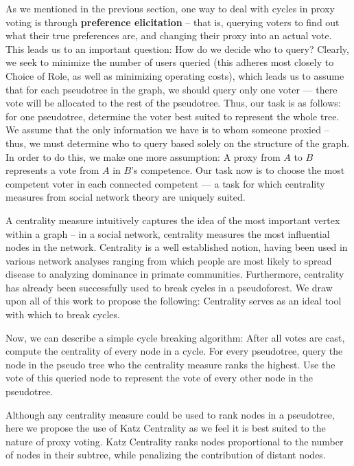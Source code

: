 \documentclass[10pt]{article}
\theoremstyle{definition}
\begin{document}
As we mentioned in the previous section, one way to deal with cycles in proxy voting is through \textbf{preference elicitation} -- that is, querying voters to find out what their true preferences are, and changing their proxy into an actual vote. This leads us to an important question: How do we decide who to query? Clearly, we seek to minimize the number of users queried (this adheres most closely to Choice of Role, as well as minimizing operating costs), which leads us to assume that for each pseudotree in the graph, we should query only one voter --- there vote will be allocated to the rest of the pseudotree. Thus, our task is as follows: for one pseudotree, determine the voter best suited to represent the whole tree. We assume that the only information we have is to whom someone proxied -- thus, we must determine who to query based solely on the structure of the graph. In order to do this, we make one more assumption: A proxy from $A$ to $B$ represents a vote from $A$ in $B$'s competence. Our task now is to choose the most competent voter in each connected competent --- a task for which centrality measures from social network theory are uniquely suited.

A centrality measure intuitively captures the idea of the most important vertex within a graph -- in a social network, centrality measures the most influential nodes in the network.\cite{centrality}\cite{cwiki} Centrality is a well established notion, having been used in various network analyses ranging from which people are most likely to spread disease to analyzing dominance in primate communities. Furthermore, centrality has already been successfully used to break cycles in a pseudoforest.\cite{wikipedia} We draw upon all of this work to propose the following: Centrality serves as an ideal tool with which to break cycles. 

Now, we can describe a simple cycle breaking algorithm: After all votes are cast, compute the centrality of every node in a cycle. For every pseudotree, query the node in the pseudo tree who the centrality measure ranks the highest. Use the vote of this queried node to represent the vote of every other node in the pseudotree.

Although any centrality measure could be used to rank nodes in a pseudotree, here we propose the use of Katz Centrality as we feel it is best suited to the nature of proxy voting. Katz Centrality ranks nodes proportional to the number of nodes in their subtree, while penalizing the contribution of distant nodes.
\end{document}
